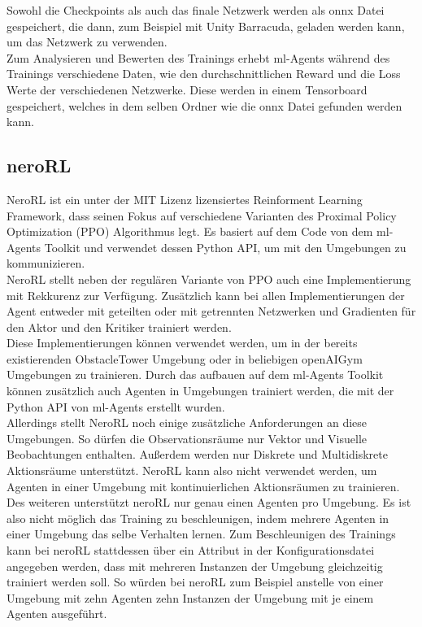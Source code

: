 \noindent Sowohl die Checkpoints als auch das finale Netzwerk werden als onnx Datei gespeichert, die dann, zum Beispiel mit Unity Barracuda, geladen werden kann, um das Netzwerk zu verwenden.\\
Zum Analysieren und Bewerten des Trainings erhebt ml-Agents während des Trainings verschiedene Daten, wie den durchschnittlichen Reward und die Loss Werte der verschiedenen Netzwerke. Diese werden in einem Tensorboard gespeichert, welches in dem selben Ordner wie die onnx Datei gefunden werden kann. 

\subsection{neroRL}

NeroRL ist ein unter der MIT Lizenz lizensiertes Reinforment Learning Framework, dass seinen Fokus auf verschiedene Varianten des Proximal Policy Optimization (PPO) Algorithmus legt. Es basiert auf dem Code von dem ml-Agents Toolkit und verwendet dessen Python API, um mit den Umgebungen zu kommunizieren. \\
NeroRL stellt neben der regulären Variante von PPO auch eine Implementierung mit Rekkurenz zur Verfügung. Zusätzlich kann bei allen Implementierungen der Agent entweder mit geteilten oder mit getrennten Netzwerken und Gradienten für den Aktor und den Kritiker trainiert werden. \\
Diese Implementierungen können verwendet werden, um in der bereits existierenden ObstacleTower Umgebung oder in beliebigen openAIGym Umgebungen zu trainieren. Durch das aufbauen auf dem ml-Agents Toolkit können zusätzlich auch Agenten in Umgebungen trainiert werden, die mit der Python API von ml-Agents erstellt wurden.\\
Allerdings stellt NeroRL noch einige zusätzliche Anforderungen an diese Umgebungen. So dürfen die Observationsräume nur Vektor und Visuelle Beobachtungen enthalten. Außerdem werden nur Diskrete und Multidiskrete Aktionsräume unterstützt. NeroRL kann also nicht verwendet werden, um Agenten in einer Umgebung mit kontinuierlichen Aktionsräumen zu trainieren.
Des weiteren unterstützt neroRL nur genau einen Agenten pro Umgebung. Es ist also nicht möglich das Training zu beschleunigen, indem mehrere Agenten in einer Umgebung das selbe Verhalten lernen. Zum Beschleunigen des Trainings kann bei neroRL stattdessen über ein Attribut in der Konfigurationsdatei angegeben werden, dass mit mehreren Instanzen der Umgebung gleichzeitig trainiert werden soll. So würden bei neroRL zum Beispiel anstelle von einer Umgebung mit zehn Agenten zehn Instanzen der Umgebung mit je einem Agenten ausgeführt.\\

